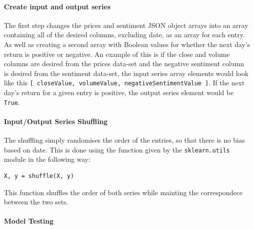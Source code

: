 \paragraph{Create input and output series}

The first step changes the prices and sentiment JSON object arrays into an array containing all of the desired columns, excluding date, as an array for each entry. As well as creating a second array with Boolean values for whether the next day's return is positive or negative. An example of this is if the close and volume columns are desired from the prices data-set and the negative sentiment column is desired from the sentiment data-set, the input series array elements would look like this \verb|[ closeValue, volumeValue, negativeSentimentValue ]|. If the next day's return for a given entry is positive, the output series element would be \verb|True|.

\paragraph{Input/Output Series Shuffling}

The shuffling simply randomises the order of the entries, so that there is no bias based on date. This is done using the function given by the \verb|sklearn.utils| module in the following way:
\begin{lstlisting}[caption=Shuffle series]
X, y = shuffle(X, y)
\end{lstlisting}
This function shuffles the order of both series while mainting the correspondece between the two sets.

\paragraph{Model Testing}

